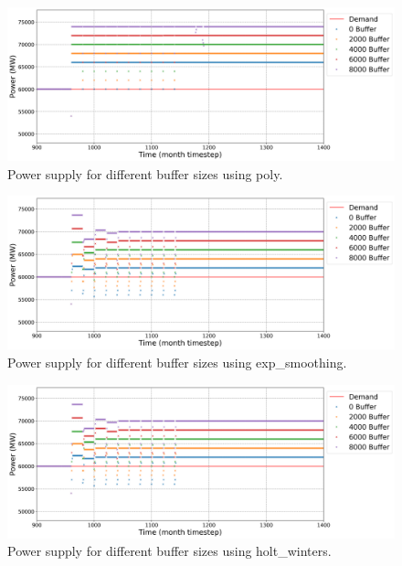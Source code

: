 \documentclass[11pt]{article}
\begin{document}
\begin{figure}[H]
	\centering
	\includegraphics[width=\textwidth]{23-figures/23-power-buffer-poly.png} 
	\hfill
    \caption{Power supply for different buffer sizes using poly.}
	\label{fig:23-buf-poly}
\end{figure}

\begin{figure}[H]
	\centering
	\includegraphics[width=\textwidth]{23-figures/23-power-buffer-exp_smoothing.png} 
	\hfill
    \caption{Power supply for different buffer sizes using exp\_smoothing.}
	\label{fig:23-buf-exp_smoothing}
\end{figure}

\begin{figure}[H]
	\centering
	\includegraphics[width=\textwidth]{23-figures/23-power-buffer-holt_winters.png} 
	\hfill
	\caption{Power supply for different buffer sizes using holt\_winters.}
	\label{fig:23-buf-hots_winters}
\end{figure}
\end{document}
